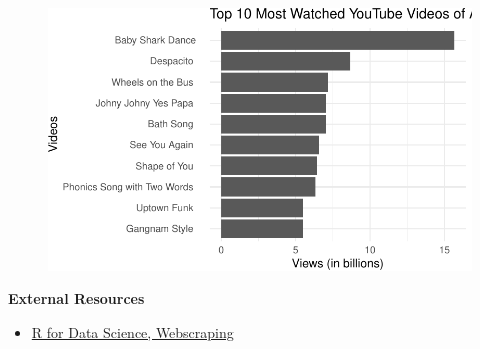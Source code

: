 \documentclass[
  letterpaper,
  DIV=11,
  numbers=noendperiod]{scrartcl}
\providecommand{\tightlist}{%
  \setlength{\itemsep}{0pt}\setlength{\parskip}{0pt}}\usepackage{longtable,booktabs,array}
\begin{document}
\begin{figure}[H]

{\centering \includegraphics{118_N_webscraping_tables_files/figure-pdf/unnamed-chunk-10-1.pdf}

}

\end{figure}

\begin{tcolorbox}[enhanced jigsaw, toprule=.15mm, opacityback=0, breakable, leftrule=.75mm, colback=white, arc=.35mm, left=2mm, rightrule=.15mm, bottomrule=.15mm]

\textbf{External Resources}\vspace{2mm}

\begin{itemize}
\tightlist
\item
  \href{https://r4ds.hadley.nz/webscraping}{R for Data Science,
  Webscraping}
\end{itemize}

\end{tcolorbox}
\end{document}

